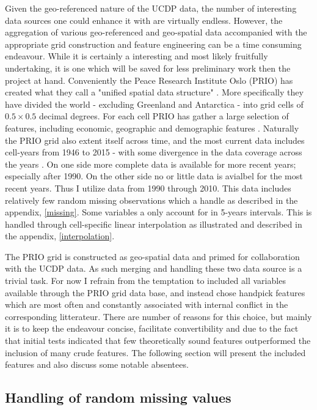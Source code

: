 \documentclass[a4paper]{article}
\begin{document}
Given the geo-referenced nature of the UCDP data, the number of interesting data sources one could enhance it with are virtually endless. However, the aggregation of various geo-referenced and geo-spatial data accompanied with the appropriate grid construction and feature engineering can be a time consuming endeavour. While it is certainly a interesting and most likely fruitfully undertaking, it is one which will be saved for less preliminary work then the project at hand. Conveniently the Peace Research Institute Oslo (PRIO) has created what they call a "unified spatial data structure" \cite[1]{Tollefsen_2012}. More specifically they have divided the world - excluding Greenland and Antarctica - into grid cells of $0.5 \times 0.5$ decimal degrees. For each cell PRIO has gather a large selection of features, including economic, geographic and demographic features \citep{Tollefsen_2012}. Naturally the PRIO grid also extent itself across time, and the most current data includes cell-years from 1946 to 2015 - with some divergence in the data coverage across the years \citep{Tollefsen_2016}. On one side more complete data is available for more recent years; especially after 1990. On the other side no or little data is avialbel for the most recent years. Thus I utilize data from 1990 through 2010. This data includes relatively few random missing observations which a handle as described in the appendix, \autoref{missing}. Some variables a only account for in 5-years intervals. This is handled through cell-specific linear interpolation as illustrated and described in the appendix, \autoref{interpolation}.\par

The PRIO grid is constructed as geo-spatial data and primed for collaboration with the UCDP data. As such merging and handling these two data source is a trivial task. For now I refrain from the temptation to included all variables available through the PRIO grid data base, and instead chose handpick features which are most often and constantly associated with internal conflict in the corresponding litterateur. There are number of reasons for this choice, but mainly it is to keep the endeavour concise, facilitate convertibility and due to the fact that initial tests indicated that few theoretically sound features outperformed the inclusion of many crude features. The following section will present the included features and also discuss some notable absentees.\par


\subsection{Handling of random missing values}\label{missing}
\end{document}
